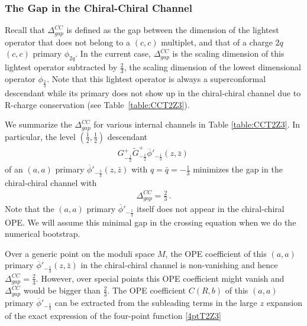 \documentclass[12pt]{article}
\begin{document}
\subsubsection*{The Gap in the Chiral-Chiral Channel}






Recall that  $\Delta^{CC}_{gap}$  is defined as the gap between the dimension of the lightest operator  that does not belong to a $(c,c)$ multiplet, and that of a charge $2q$ $(c,c)$ primary $\phi_{2q}$.  In the current case, $\Delta^{CC}_{gap}$ is  the scaling dimension of this  lightest operator  subtracted by  $\frac23$, the scaling dimension of the lowest dimensional operator $\phi_{\frac23}$.  Note that this  lightest operator is always a superconformal descendant while its  primary does not show up in the chiral-chiral channel due to R-charge conservation (see Table~\ref{table:CCT2Z3}).



 We summarize the $\Delta^{CC}_{gap}$ for various internal channels in Table \ref{table:CCT2Z3}. 
In particular, the level $(\frac12 , \frac12)$ descendant  
\begin{align}\label{aadescendant}
G_{-\frac12}^+  \tilde G_{-\frac12}^+ \overline\phi'_{-\frac13}(z,\bar z)\,
\end{align}
of an $(a,a)$ primary $\overline\phi'_{-\frac13}(z,\bar z)$ with $q=\bar q=-\frac13$ minimizes the gap  in the chiral-chiral channel with
\begin{align}
\Delta^{CC}_{gap}= \frac 2 3\,.
\end{align} 
Note that the $(a,a)$ primary $\overline\phi'_{-\frac13}$  itself does not appear in the chiral-chiral OPE.  
  We will assume this minimal gap in the crossing equation when we do the numerical bootstrap.
  



Over a generic point on the moduli space $M$, the OPE coefficient of this $(a,a)$ primary $\overline\phi'_{-\frac13}(z,\bar z)$ in the chiral-chiral channel is non-vanishing and hence $\Delta^{CC}_{gap}=\frac23$.  However, over special points this OPE coefficient might vanish and $\Delta^{CC}_{gap}$  would be bigger than $\frac23$.  The OPE coefficient $C(R,b)$ of this $(a,a)$ primary $\overline\phi'_{-\frac13}$ can be extracted from the subleading terms in the large $z$ expansion of the exact expression of the four-point function \eqref{4ptT2Z3} 
\end{document}
